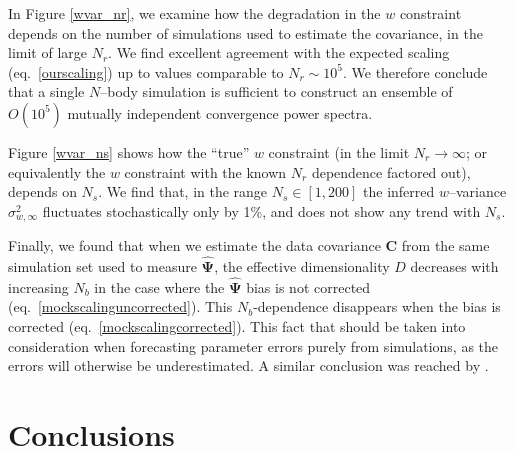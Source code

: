 \documentclass[reprint,aps,prd,superscriptaddress,showkeys,showpacs]{revtex4-1}
\newcommand{\bb}[1]{\mathbf{#1}}
\newcommand{\bbh}[1]{\mathbf{\hat{#1}}}
\begin{document}
In Figure \ref{wvar_nr}, we examine how the degradation in the $w$
constraint depends on the number of simulations used to estimate the
covariance, in the limit of large $N_r$. We find excellent agreement
with the expected scaling (eq.~\ref{ourscaling}) up to values
comparable to $N_r\sim 10^5$. We therefore conclude that a single
$N$--body simulation is sufficient to construct an ensemble of
$O(10^5)$ mutually independent convergence power spectra.

Figure \ref{wvar_ns} shows how the ``true'' $w$ constraint (in the
limit $N_r\rightarrow \infty$; or equivalently the $w$ constraint with
the known $N_r$ dependence factored out),
depends on $N_s$. We find that, in the range $N_s\in[1,200]$ the
inferred $w$--variance $\sigma_{w,\infty}^2$ fluctuates stochastically
only by 1\%, and does not show any trend with $N_s$.

Finally, we found that when we estimate the data covariance $\bb{C}$
from the same simulation set used to measure $\bbh{\Psi}$, the
effective dimensionality $D$ decreases with increasing $N_b$ in the
case where the $\bbh{\Psi}$ bias is not corrected
(eq.~\ref{mockscalinguncorrected}).  This $N_b$-dependence disappears
when the bias is corrected (eq.~\ref{mockscalingcorrected}).  This
fact that should be taken into consideration when forecasting
parameter errors purely from simulations, as the errors will otherwise
be underestimated. A similar conclusion was reached by \citep{Hartlap07}.




\section{Conclusions}
\end{document}
